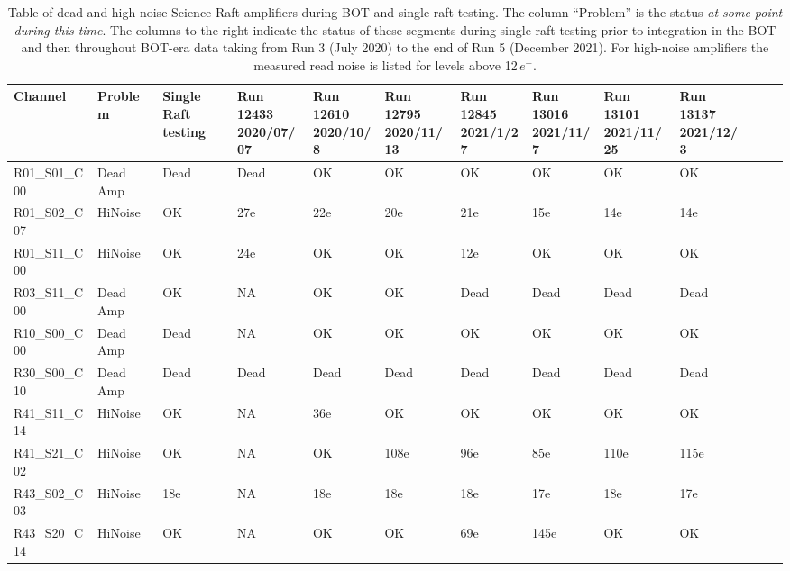 \begin{table}[!ht]
    \tiny
    \centering
    \begin{tabular}{|l|l|l|l|l|l|l|l|l|l|l|l|l|}
    \hline
        Channel & Problem & \makecell{ Single Raft \\ testing } & \makecell{ Run 12433 \\ 2020/07/07} & \makecell{ Run 12610 \\ 2020/10/8} & \makecell{ Run 12795 \\ 2020/11/13} & \makecell{ Run 12845 \\ 2021/1/27} & \makecell{ Run 13016 \\ 2021/11/7} & \makecell{ Run 13101 \\ 2021/11/25} & \makecell{Run 13137 \\ 2021/12/3} \\ \hline
        R01\_S01\_C00  & Dead Amp & Dead & Dead & OK & OK & OK & OK & OK & OK \\ \hline
        R01\_S02\_C07  & HiNoise & OK & 27e & 22e & 20e & 21e & 15e & 14e & 14e \\ \hline
        R01\_S11\_C00  & HiNoise & OK & 24e & OK & OK & 12e & OK & OK & OK \\ \hline
        R03\_S11\_C00  & Dead Amp & OK & NA & OK & OK & Dead & Dead & Dead & Dead \\ \hline
        R10\_S00\_C00  & Dead Amp & Dead & NA & OK & OK & OK & OK & OK & OK \\ \hline
        R30\_S00\_C10  & Dead Amp & Dead & Dead & Dead & Dead & Dead & Dead & Dead & Dead \\ \hline
        R41\_S11\_C14  & HiNoise & OK & NA & 36e & OK & OK & OK & OK & OK \\ \hline
        R41\_S21\_C02  & HiNoise & OK & NA & OK & 108e & 96e & 85e & 110e & 115e \\ \hline
        R43\_S02\_C03  & HiNoise & 18e & NA & 18e & 18e & 18e & 17e & 18e & 17e \\ \hline
        R43\_S20\_C14  & HiNoise & OK & NA & OK & OK & 69e & 145e & OK & OK \\ \hline

    \end{tabular}
    \caption{Table of dead and high-noise Science Raft amplifiers during BOT and single raft testing. The column ``Problem'' is the status {\it at some point during this time}.  The columns to the right indicate the status of these segments during single raft testing prior to integration in the BOT and then throughout BOT-era data taking from Run 3 (July 2020) to the end of Run 5 (December 2021). For high-noise amplifiers the measured read noise is listed for levels above 12\,$e^{-}$. \label{tab:BOTbadamp}}
\end{table}

